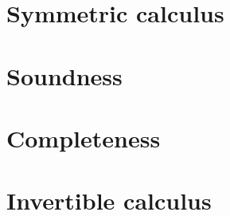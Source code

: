\begin{scope}
\begin{scope}

\section{Symmetric calculus}



\section{Soundness}



\section{Completeness}



\section{Invertible calculus}





%   





\end{scope}
\end{scope}
